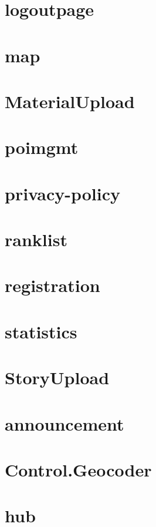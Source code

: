 \section{logoutpage}

\newpage
\section{map}

\newpage
\section{MaterialUpload}

\newpage
\section{poimgmt}

\newpage
\section{privacy-policy}

\newpage
\section{ranklist}

\newpage
\section{registration}

\newpage
\section{statistics}

\newpage
\section{StoryUpload}

\newpage
\section{announcement}

\newpage
\section{Control.Geocoder}

\newpage
\section{hub}

\newpage
